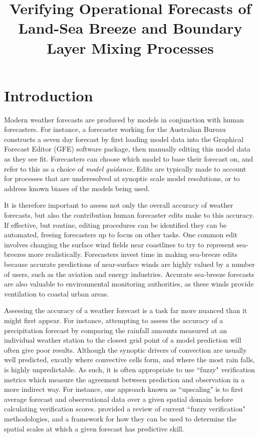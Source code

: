\documentclass{ametsoc}
\title{Verifying Operational Forecasts of Land-Sea Breeze and Boundary Layer Mixing Processes}
\affiliation{School of Earth Sciences, and ARC Centre of Excellence for Climate Extremes, The University of Melbourne, Melbourne, Victoria, Australia.}
\begin{document}
\maketitle

\section{Introduction}\label{introduction}
Modern weather forecasts are produced by models in conjunction with human forecasters. For instance, a forecaster working for the Australian Bureau constructs a seven day forecast by first loading model data into the Graphical Forecast Editor (GFE) software package, then manually editing this model data as they see fit. Forecasters can choose which model to base their forecast on, and refer to this as a choice of \textit{model guidance}. Edits are typically made to account for processes that are underesolved at synoptic scale model resolutions, or to address known biases of the models being used. 

It is therefore important to assess not only the overall accuracy of weather forecasts, but also the contribution human forecaster edits make to this accuracy. If effective, but routine, editing procedures can be identified they can be automated, freeing forecasters up to focus on other tasks. One common edit involves changing the surface wind fields near coastlines to try to represent sea-breezes more realistically. Forecasters invest time in making sea-breeze edits because accurate predictions of near-surface winds are highly valued by a number of users, such as the aviation and energy \citep{smith09} industries. Accurate sea-breeze forecasts are also valuable to environmental monitoring authorities, as these winds provide ventilation to coastal urban areas.

Assessing the accuracy of a weather forecast is a task far more nuanced than it might first appear. For instance, attempting to assess the accuracy of a precipitation forecast by comparing the rainfall amounts measured at an individual weather station to the closest grid point of a model prediction will often give poor results. Although the synoptic drivers of convection are usually well predicted, excatly where convective cells form, and where the most rain falls, is highly unpredictable. As such, it is often appropriate to use ``fuzzy" verification metrics which measure the agreement between prediction and observation in a more indirect way. For instance, one approach known as ``upscaling" is to first average forecast and observational data over a given spatial domain before calculating verification scores. \citet{ebert08} provided a review of current ``fuzzy verification" methodologies, and a framework for how they can be used to determine the spatial scales at which a given forecast has predictive skill.      
\end{document}
